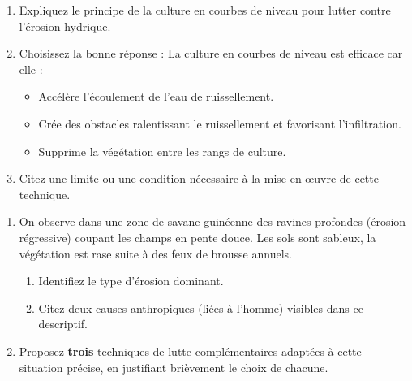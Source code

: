 \documentclass[11pt]{article}
\begin{document}
\begin{exercice}
\begin{enumerate}
    \item Expliquez le principe de la culture en courbes de niveau pour lutter contre l'érosion hydrique.
    \item Choisissez la bonne réponse : La culture en courbes de niveau est efficace car elle :
    \begin{itemize}
        \item Accélère l'écoulement de l'eau de ruissellement.
        \item Crée des obstacles ralentissant le ruissellement et favorisant l'infiltration.
        \item Supprime la végétation entre les rangs de culture.
    \end{itemize}
    \item Citez une limite ou une condition nécessaire à la mise en œuvre de cette technique.
\end{enumerate}
\end{exercice}

\begin{exercice}
\begin{enumerate}
    \item On observe dans une zone de savane guinéenne des ravines profondes (érosion régressive) coupant les champs en pente douce. Les sols sont sableux, la végétation est rase suite à des feux de brousse annuels.
    \begin{enumerate}
        \item Identifiez le type d'érosion dominant.
        \item Citez deux causes anthropiques (liées à l'homme) visibles dans ce descriptif.
    \end{enumerate}
    \item Proposez \textbf{trois} techniques de lutte complémentaires adaptées à cette situation précise, en justifiant brièvement le choix de chacune.
\end{enumerate}
\end{exercice}
\end{document}
